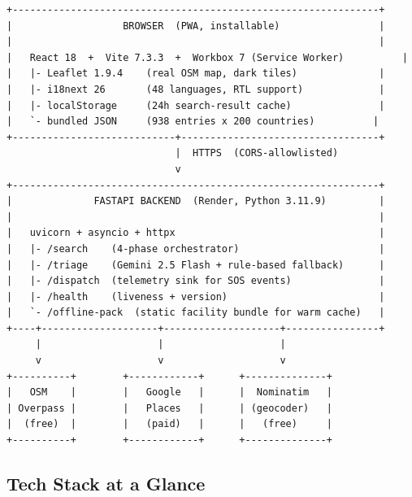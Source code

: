 \documentclass[11pt, a4paper]{article}
\begin{document}
\begin{lstlisting}[language={},numbers=none,frame=none,backgroundcolor=\color{white}]
+---------------------------------------------------------------+
|                   BROWSER  (PWA, installable)                 |
|                                                               |
|   React 18  +  Vite 7.3.3  +  Workbox 7 (Service Worker)          |
|   |- Leaflet 1.9.4    (real OSM map, dark tiles)              |
|   |- i18next 26       (48 languages, RTL support)             |
|   |- localStorage     (24h search-result cache)               |
|   `- bundled JSON     (938 entries x 200 countries)          |
+----------------------------+----------------------------------+
                             |  HTTPS  (CORS-allowlisted)
                             v
+---------------------------------------------------------------+
|              FASTAPI BACKEND  (Render, Python 3.11.9)         |
|                                                               |
|   uvicorn + asyncio + httpx                                   |
|   |- /search    (4-phase orchestrator)                        |
|   |- /triage    (Gemini 2.5 Flash + rule-based fallback)      |
|   |- /dispatch  (telemetry sink for SOS events)               |
|   |- /health    (liveness + version)                          |
|   `- /offline-pack  (static facility bundle for warm cache)   |
+----+--------------------+--------------------+----------------+
     |                    |                    |
     v                    v                    v
+----------+        +------------+      +--------------+
|   OSM    |        |   Google   |      |  Nominatim   |
| Overpass |        |   Places   |      | (geocoder)   |
|  (free)  |        |   (paid)   |      |   (free)     |
+----------+        +------------+      +--------------+
\end{lstlisting}

\subsection{Tech Stack at a Glance}
\end{document}
